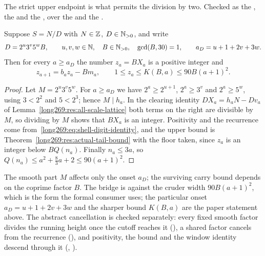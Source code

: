 \documentclass[11pt]{article}
\begin{document}
\noindent The strict upper endpoint is what permits the division by two.
Checked as the
, the
 and the
,
over the
 and the
.

\begin{theorem}
\label{long269:res:actual-cancellation}\label{long269:res:lead-carry-bridge}
\label{long269:res:actual-carry-bound}\label{long269:res:denominator-reduction}
Suppose $S=N/D$ with $N\in\mathbb{Z}$, $D\in\mathbb{N}_{>0}$, and write
\[
 D=2^{u}3^{v}5^{w}B,\qquad u,v,w\in\mathbb{N},\quad B\in\mathbb{N}_{>0},\quad\gcd(B,30)=1,
 \qquad a_D=u+1+2v+3w .
\]
Then for every $a\ge a_D$ the number $z_a=BX_a$ is a positive integer and
\[
 z_{a+1}=b_az_a-Bm_a,\qquad 1\le z_a\le K(B,a)\le90B(a+1)^{2} .
\]
\end{theorem}

\begin{proof}
Let $M=2^{u}3^{v}5^{w}$.  For $a\ge a_D$ we have $2^{a}\ge2^{u+1}$,
$2^{a}\ge3^{v}$ and $2^{a}\ge5^{w}$, using $3<2^{2}$ and $5<2^{3}$; hence
$M\mid h_a$.  In the clearing identity $DX_a=h_aN-Dv_a$ of
Lemma~\ref{long269:res:all-scale-lattice} both terms on the right are divisible by $M$,
so dividing by $M$ shows that $BX_a$ is an integer.  Positivity and the
recurrence come from~\eqref{long269:eq:shell-digit-identity}, and the upper bound is
Theorem~\ref{long269:res:actual-tail-bound} with the floor taken, since $z_a$ is an
integer below $BQ(n_a)$.  Finally $n_a\le3a$, so
$Q(n_a)\le a^{2}+\tfrac83a+2\le90(a+1)^{2}$.
\end{proof}

\noindent The smooth part $M$ affects only the onset $a_D$; the surviving carry
bound depends on the coprime factor $B$.  The bridge is
against the cruder width $90B(a+1)^{2}$, which is the form the formal consumer
uses; the particular onset $a_D=u+1+2v+3w$ and the sharper bound
$K(B,a)$ are the paper statement above.  The abstract cancellation is checked
separately: every fixed smooth factor divides the running height once the
cutoff reaches it
(),
a shared factor cancels from the recurrence
(),
and positivity, the bound and the window identity descend through it
(,
).
\end{document}
